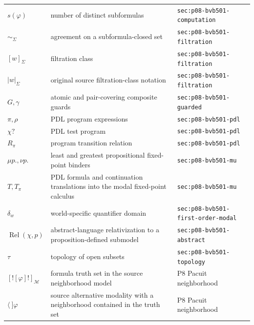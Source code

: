 \begin{longtable}{@{}p{}p{}p{}@{}}
\(s(\varphi)\) & number of distinct subformulas & \texttt{sec:\allowbreak{}p08-\allowbreak{}bvb501-\allowbreak{}computation} \\
\(\sim_\Sigma\) & agreement on a subformula-closed set & \texttt{sec:\allowbreak{}p08-\allowbreak{}bvb501-\allowbreak{}filtration} \\
\([w]_\Sigma\) & filtration class & \texttt{sec:\allowbreak{}p08-\allowbreak{}bvb501-\allowbreak{}filtration} \\
\(\lvert w\rvert_\Sigma\) & original source filtration-class notation & \texttt{sec:\allowbreak{}p08-\allowbreak{}bvb501-\allowbreak{}filtration} \\
\(G,\allowbreak \gamma\) & atomic and pair-covering composite guards & \texttt{sec:\allowbreak{}p08-\allowbreak{}bvb501-\allowbreak{}guarded} \\
\(\pi,\allowbreak \rho\) & PDL program expressions & \texttt{sec:\allowbreak{}p08-\allowbreak{}bvb501-\allowbreak{}pdl} \\
\(\chi?\) & PDL test program & \texttt{sec:\allowbreak{}p08-\allowbreak{}bvb501-\allowbreak{}pdl} \\
\(R_\pi\) & program transition relation & \texttt{sec:\allowbreak{}p08-\allowbreak{}bvb501-\allowbreak{}pdl} \\
\(\mu p.,\allowbreak \nu p.\) & least and greatest propositional fixed-point binders & \texttt{sec:\allowbreak{}p08-\allowbreak{}bvb501-\allowbreak{}mu} \\
\(T,\allowbreak T_\pi\) & PDL formula and continuation translations into the modal fixed-point calculus & \texttt{sec:\allowbreak{}p08-\allowbreak{}bvb501-\allowbreak{}mu} \\
\(\delta_w\) & world-specific quantifier domain & \texttt{sec:\allowbreak{}p08-\allowbreak{}bvb501-\allowbreak{}first-\allowbreak{}order-\allowbreak{}modal} \\
\(\operatorname{Rel}(\chi,\allowbreak p)\) & abstract-language relativization to a proposition-defined submodel & \texttt{sec:\allowbreak{}p08-\allowbreak{}bvb501-\allowbreak{}abstract} \\
\(\tau\) & topology of open subsets & \texttt{sec:\allowbreak{}p08-\allowbreak{}bvb501-\allowbreak{}topology} \\
\([![\varphi]!]_{\mathcal M}\) & formula truth set in the source neighborhood model & P8 Pacuit neighborhood \\
\(\langle\ ]\varphi\) & source alternative modality with a neighborhood contained in the truth set & P8 Pacuit neighborhood \\

\end{longtable}
